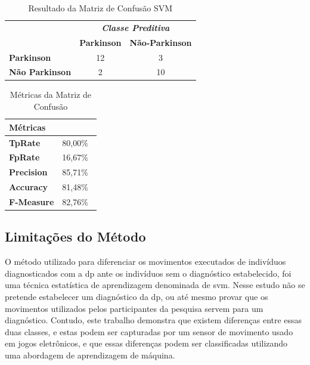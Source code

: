 \begin{table}[!htbp]
\caption{Resultado da Matriz de Confusão SVM}
\label{table:resultadomatrizconfusaosvm}
\centering
\begin{tabular}{l|c|c|}
\cline{2-3}
\multicolumn{1}{c}{}                         & \multicolumn{2}{|c|}{\textit{\textbf{Classe Preditiva}}} \\ \cline{2-3} 
                                             & \textbf{Parkinson}      & \textbf{Não-Parkinson}         \\ \hline
\multicolumn{1}{|l|}{\textbf{Parkinson}} & 12       & 3           \\ \hline
\multicolumn{1}{|l|}{\textbf{Não Parkinson}}     & 2           & 10     \\ \hline
\end{tabular}

\end{table}



\begin{table}[!htbp]
\label{table:metricasmatrizconfusao}
\caption{Métricas da Matriz de Confusão}
\centering
\begin{tabular}{|l|r|}
\hline
\multicolumn{2}{|l|}{\textbf{Métricas}} \\ \hline
\textbf{TpRate}                    & 80,00$\%$\                 \\ \hline
\textbf{FpRate}                    & 16,67$\%$\                \\ \hline
\textbf{Precision}                 & 85,71$\%$\                \\ \hline
\textbf{Accuracy}                  & 81,48$\%$\                \\ \hline
\textbf{F-Measure}                 & 82,76$\%$\                \\ \hline
\end{tabular}
\end{table}


\subsection{Limitações do Método}
O método utilizado para diferenciar os movimentos executados de indivíduos diagnosticados com a \ac{dp} ante os indivíduos sem o diagnóstico estabelecido, foi uma técnica estatística de aprendizagem denominada de \ac{svm}. Nesse estudo não se pretende estabelecer um diagnóstico da \ac{dp}, ou até mesmo provar que os movimentos utilizados pelos participantes da pesquisa servem para um diagnóstico. Contudo, este trabalho demonstra que existem diferenças entre essas duas classes, e estas podem ser capturadas por um sensor de movimento usado em jogos eletrônicos, e que essas diferenças podem ser classificadas utilizando uma abordagem de aprendizagem de máquina. 

